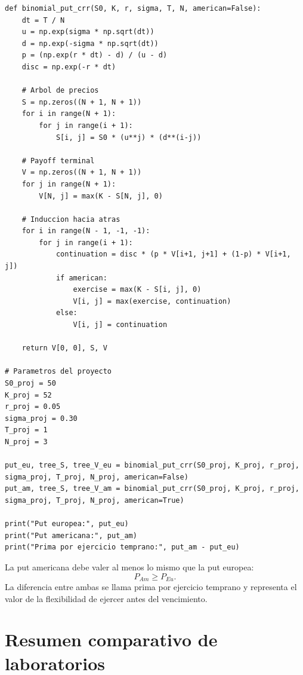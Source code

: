 \documentclass[12pt,a4paper]{article}
\begin{document}
\begin{lstlisting}[style=pythonstyle]
def binomial_put_crr(S0, K, r, sigma, T, N, american=False):
    dt = T / N
    u = np.exp(sigma * np.sqrt(dt))
    d = np.exp(-sigma * np.sqrt(dt))
    p = (np.exp(r * dt) - d) / (u - d)
    disc = np.exp(-r * dt)

    # Arbol de precios
    S = np.zeros((N + 1, N + 1))
    for i in range(N + 1):
        for j in range(i + 1):
            S[i, j] = S0 * (u**j) * (d**(i-j))

    # Payoff terminal
    V = np.zeros((N + 1, N + 1))
    for j in range(N + 1):
        V[N, j] = max(K - S[N, j], 0)

    # Induccion hacia atras
    for i in range(N - 1, -1, -1):
        for j in range(i + 1):
            continuation = disc * (p * V[i+1, j+1] + (1-p) * V[i+1, j])
            if american:
                exercise = max(K - S[i, j], 0)
                V[i, j] = max(exercise, continuation)
            else:
                V[i, j] = continuation

    return V[0, 0], S, V

# Parametros del proyecto
S0_proj = 50
K_proj = 52
r_proj = 0.05
sigma_proj = 0.30
T_proj = 1
N_proj = 3

put_eu, tree_S, tree_V_eu = binomial_put_crr(S0_proj, K_proj, r_proj, sigma_proj, T_proj, N_proj, american=False)
put_am, tree_S, tree_V_am = binomial_put_crr(S0_proj, K_proj, r_proj, sigma_proj, T_proj, N_proj, american=True)

print("Put europea:", put_eu)
print("Put americana:", put_am)
print("Prima por ejercicio temprano:", put_am - put_eu)
\end{lstlisting}

\begin{interpretacion}
La put americana debe valer al menos lo mismo que la put europea:
\[
P_{Am}\geq P_{Eu}.
\]
La diferencia entre ambas se llama prima por ejercicio temprano y representa el valor de la flexibilidad de ejercer antes del vencimiento.
\end{interpretacion}

\section{Resumen comparativo de laboratorios}
\end{document}

